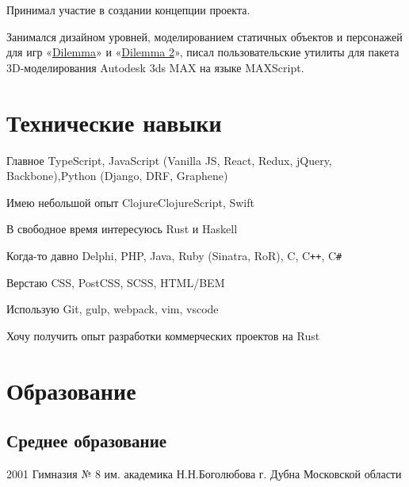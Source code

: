 \documentclass[11pt,a4paper,sans]{moderncv}
\newcommand{\lang}[2]{#1}
\begin{document}
\cvlistitem
    {\lang
        {Принимал участие в создании концепции проекта.}
        {TODO}}

\cvlistitem
    {\lang
        {Занимался дизайном уровней, моделированием статичных объектов и персонажей для игр «\href{http://ru.akella.com/Game.aspx?id=354}{Dilemma}» и «\href{http://ru.akella.com/Game.aspx?id=1898}{Dilemma 2}», писал пользовательские утилиты для пакета 3D-моделирования Autodesk 3ds MAX на языке MAXScript.}
        {TODO}\newline}


\section
    {\lang
        {Технические навыки}
        {Technical Skills}}

\cvline
    {\lang
        {Главное}
        {Main}}
    {TypeScript, JavaScript (Vanilla JS, React, Redux, jQuery, Backbone),\newline Python (Django, DRF, Graphene)}

\cvline
{\lang
    {Имею небольшой опыт}
    {TODO}}
{ClojureClojureScript, Swift}

\cvline
    {\lang
        {В свободное время}
        {TODO}}
    {\lang
        {интересуюсь Rust и Haskell}
        {Have an interest in Rust and Haskell}}

\cvline
    {\lang
        {Когда-то давно}
        {TODO}}
    {Delphi, PHP, Java, Ruby (Sinatra, RoR), C, C\texttt{++}, C\texttt{\#}}

\cvline
    {\lang
        {Верстаю}
        {TODO}}
    {CSS, PostCSS, SCSS, HTML/BEM}

\cvline
    {\lang
        {Использую}
        {TODO}}
    {Git, gulp, webpack, vim, vscode}

\cvline
    {\lang
        {Хочу получить опыт}
        {TODO}}
    {\lang
        {разработки коммерческих проектов на Rust}
        {TODO}}


\section
    {\lang
        {Образование}
        {Education}}


\subsection
    {\lang
        {Среднее образование}
        {Secondary school }}

\cventry
    {2001}
    {\lang
        {Гимназия № 8 им. академика Н.Н.Боголюбова}
        {TODO}}
    {\lang
        {г. Дубна Московской области}
        {Dubna}}
    {}
    {}
    {}
\end{document}
